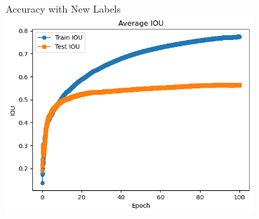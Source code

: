 




\begin{frame}{Accuracy with New Labels}
    \centering
    \includegraphics[height=0.7\textheight,width=0.7\textwidth,keepaspectratio]{images/iou.png}
\end{frame}

